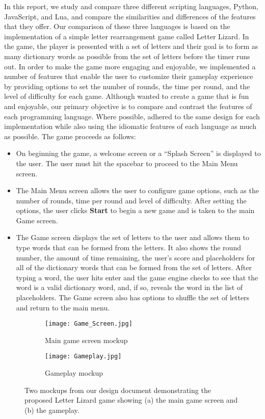In this report, we study and compare three different scripting languages, Python,
JavaScript, and Lua, and compare the similarities and differences of the features that
they offer. Our comparison of these three languages
is based on the implementation of a simple letter rearrangement game
called Letter Lizard. In the game, the player is presented with a set of letters and 
their goal is to form as many dictionary words as possible from the set of letters
before the timer runs out. In order to make the game
more engaging and enjoyable, we implemented a number of features that enable the user to customize
their gameplay experience by providing options to set the number of rounds, the time per round, 
and the level of difficulty for each
game. Although wanted to create a game that is fun and enjoyable, our primary objective is to
compare and contrast the features of each programming language. Where possible, adhered to the same
design for each implementation while also using the idiomatic features of each language as much as 
possible. The game proceeds as follows:

\begin{itemize}
    \item On beginning the game, a welcome screen or a ``Splash Screen'' is displayed
    to the user. The user must hit the spacebar to proceed to the Main Menu screen.
    \item The Main Menu screen allows the user to configure game options, such as the
    number of rounds, time per round and level of difficulty. After setting the options, the
    user clicks \textbf{Start} to begin a new game and is taken to the main Game screen.
    \item The Game screen displays the set of letters to the user and allows them to type
    words that can be formed from the letters. It also shows the round number, the amount of
    time remaining, the user's score and placeholders for all of the dictionary words that
    can be formed from the set of letters. After typing a word, the user hits
    enter and the game engine checks to see that the word is a valid dictionary word, and, if so,
    reveals the word in the list of placeholders. The Game screen also has options to shuffle
    the set of letters and return to the main menu.
\end{itemize}

\begin{figure}
    \centering
    \begin{subfigure}{0.49\textwidth}
        \texttt{[image: Game\_Screen.jpg]}
        \caption{Main game screen mockup}
        \label{mainscreenmockup}
    \end{subfigure}
    \begin{subfigure}{0.49\textwidth}
        \texttt{[image: Gameplay.jpg]}
        \caption{Gameplay mockup}
        \label{gameplaymockup}
    \end{subfigure}
    \caption{Two mockups from our design document demonstrating the proposed Letter Lizard game
    showing (a) the main game screen and (b) the gameplay.}
    \label{mockups}
\end{figure}

